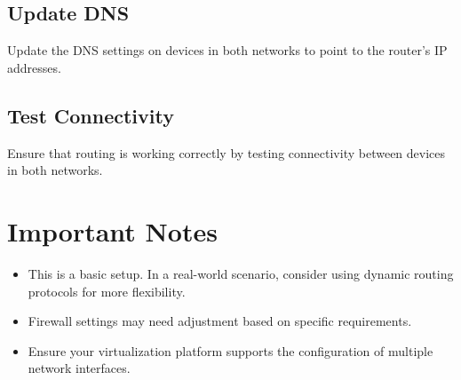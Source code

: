 \documentclass{article}
\begin{document}
\subsection{Update DNS}

Update the DNS settings on devices in both networks to point to the router's IP addresses.

\subsection{Test Connectivity}

Ensure that routing is working correctly by testing connectivity between devices in both networks.

\section{Important Notes}

\begin{itemize}
	\item This is a basic setup. In a real-world scenario, consider using dynamic routing protocols for more flexibility.
	\item Firewall settings may need adjustment based on specific requirements.
	\item Ensure your virtualization platform supports the configuration of multiple network interfaces.
\end{itemize}
\end{document}
